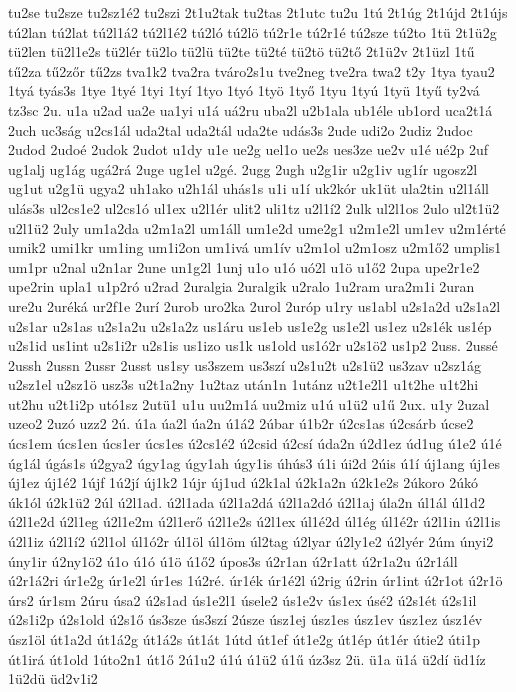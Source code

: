 {tu2se
tu2sze
tu2sz1é2
tu2szi
2t1u2tak
tu2tas
2t1utc
tu2u
1tú
2t1úg
2t1újd
2t1újs
tú2lan
tú2lat
tú2l1á2
tú2l1é2
tú2ló
tú2lö
tú2r1e
tú2r1é
tú2sze
tú2to
1tü
2t1ü2g
tü2len
tü2l1e2s
tü2lér
tü2lo
tü2lü
tü2te
tü2té
tü2tö
tü2tő
2t1ü2v
2t1üzl
1tű
tű2za
tű2zőr
tű2zs
tva1k2
tva2ra
tváro2s1u
tve2neg
tve2ra
twa2
t2y
1tya
tyau2
1tyá
tyás3s
1tye
1tyé
1tyi
1tyí
1tyo
1tyó
1työ
1tyő
1tyu
1tyú
1tyü
1tyű
ty2vá
tz3sc
2u.
u1a
u2ad
ua2e
ua1yi
u1á
uá2ru
uba2l
u2b1ala
ub1éle
ub1ord
uca2t1á
2uch
uc3ság
u2cs1ál
uda2tal
uda2tál
uda2te
udás3s
2ude
udi2o
2udiz
2udoc
2udod
2udoé
2udok
2udot
u1dy
u1e
ue2g
uel1o
ue2s
ues3ze
ue2v
u1é
ué2p
2uf
ug1alj
ug1ág
ugá2rá
2uge
ug1el
u2gé.
2ugg
2ugh
u2g1ir
u2g1iv
ug1ír
ugosz2l
ug1ut
u2g1ü
ugya2
uh1ako
u2h1ál
uhás1s
u1i
u1í
uk2kór
uk1üt
ula2tin
u2l1áll
ulás3s
ul2cs1e2
ul2cs1ó
ul1ex
u2l1ér
ulit2
uli1tz
u2l1í2
2ulk
ul2l1os
2ulo
ul2t1ü2
u2l1ü2
2uly
um1a2da
u2m1a2l
um1áll
um1e2d
ume2g1
u2m1e2l
um1ev
u2m1érté
umik2
umi1kr
um1ing
um1i2on
um1ivá
um1ív
u2m1ol
u2m1osz
u2m1ő2
umplis1
um1pr
u2nal
u2n1ar
2une
un1g2l
1unj
u1o
u1ó
uó2l
u1ö
u1ő2
2upa
upe2r1e2
upe2rin
upla1
u1p2ró
u2rad
2uralgia
2uralgik
u2ralo
1u2ram
ura2m1i
2uran
ure2u
2uréká
ur2f1e
2urí
2urob
uro2ka
2urol
2uróp
u1ry
us1abl
u2s1a2d
u2s1a2l
u2s1ar
u2s1as
u2s1a2u
u2s1a2z
us1áru
us1eb
us1e2g
us1e2l
us1ez
u2s1ék
us1ép
u2s1id
us1int
u2s1i2r
u2s1is
us1izo
us1k
us1old
us1ó2r
u2s1ö2
us1p2
2uss.
2ussé
2ussh
2ussn
2ussr
2usst
us1sy
us3szem
us3szí
u2s1u2t
u2s1ü2
us3zav
u2sz1ág
u2sz1el
u2sz1ö
usz3s
u2t1a2ny
1u2taz
után1n
1utánz
u2t1e2l1
u1t2he
u1t2hi
ut2hu
u2t1i2p
utó1sz
2utü1
u1u
uu2m1á
uu2miz
u1ú
u1ü2
u1ű
2ux.
u1y
2uzal
uzeo2
2uzó
uzz2
2ú.
ú1a
úa2l
úa2n
ú1á2
2úbar
ú1b2r
ú2cs1as
ú2csárb
úcse2
úcs1em
úcs1en
úcs1er
úcs1es
ú2cs1é2
ú2csid
ú2csí
úda2n
ú2d1ez
úd1ug
ú1e2
ú1é
úg1ál
úgás1s
ú2gya2
úgy1ag
úgy1ah
úgy1is
úhús3
ú1i
úi2d
2úis
ú1í
új1ang
új1es
új1ez
új1é2
1újf
1ú2jí
új1k2
1újr
új1ud
ú2k1al
ú2k1a2n
ú2k1e2s
2úkoro
2úkó
úk1ól
ú2k1ü2
2úl
ú2l1ad.
ú2l1ada
ú2l1a2dá
ú2l1a2dó
ú2l1aj
úla2n
úl1ál
úl1d2
ú2l1e2d
ú2l1eg
ú2l1e2m
ú2l1erő
ú2l1e2s
ú2l1ex
úl1é2d
úl1ég
úl1é2r
ú2l1in
ú2l1is
ú2l1iz
ú2l1í2
ú2l1ol
úl1ó2r
úl1öl
úl1öm
úl2tag
ú2lyar
ú2ly1e2
ú2lyér
2úm
únyi2
úny1ir
ú2ny1ö2
ú1o
ú1ó
ú1ö
ú1ő2
úpos3s
ú2r1an
ú2r1att
ú2r1a2u
ú2r1áll
ú2r1á2ri
úr1e2g
úr1e2l
úr1es
1ú2ré.
úr1ék
úr1é2l
ú2rig
ú2rin
úr1int
ú2r1ot
ú2r1ö
úrs2
úr1sm
2úru
úsa2
ú2s1ad
ús1e2l1
úsele2
ús1e2v
ús1ex
úsé2
ú2s1ét
ú2s1il
ú2s1i2p
ú2s1old
ú2s1ő
ús3sze
ús3szí
2úsze
úsz1ej
úsz1es
úsz1ev
úsz1ez
úsz1év
úsz1öl
út1a2d
út1á2g
út1á2s
út1át
1útd
út1ef
út1e2g
út1ép
út1ér
útie2
úti1p
út1irá
út1old
1úto2n1
út1ő
2ú1u2
ú1ú
ú1ü2
ú1ű
úz3sz
2ü.
ü1a
ü1á
ü2dí
üd1íz
1ü2dü
üd2v1i2
}
